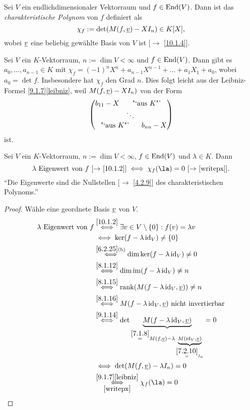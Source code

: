 \documentclass[../../main.tex]{subfiles}
\begin{document}
\begin{df}\label{10.1.5}
Sei $V$ ein endlichdimensionaler Vektorraum und $f\in \operatorname{End}(V)$. Dann ist das \emph{charakteristische Polynom} von $f$ definiert als \[\chi_f := \det(M(f,{\underline v})- XI_n)\in K[X],\] wobei ${\underline v}$ eine beliebig gewählte Basis von $V$ ist [$\to$ \ref{10.1.4}].
\end{df}

\begin{bem}\label{10.1.6}
Sei $V$ ein $K$-Vektorraum, $n:= \dim V < \infty$ und $f\in \operatorname{End}(V)$. Dann gibt es $a_0,\ldots,a_{n-1}\in K$ mit $\chi_f = (-1)^nX^n+ a_{n-1}X^{n-1} + \ldots + a_1X_1+a_0$, wobei $a_0 = \det f$. Insbesondere hat $\chi_f$ den Grad $n$.
Dies folgt leicht aus der Leibniz-Formel \ref{9.1.7}\eqref{leibniz}, weil $M(f,{\underline v})- XI_n)$ von der Form
\[\begin{pmatrix}
b_{11}-X &\multicolumn{2}{c}{\text{"`aus $K$"'}}\\
& \ddots\\
\multicolumn{2}{c}{\text{"`aus $K$"'}} & b_{nn}-X
\end{pmatrix}\]
ist.
\end{bem}

\begin{pro}\label{10.1.7}
Sei $V$ ein $K$-Vektorraum, $n:=\dim V < \infty$, $f\in \operatorname{End}(V)$ und $\lambda\in K$. Dann
\[\lambda\text{ Eigenwert von }f \text{ \rm[$\to$ \ref{10.1.2}]} \iff \chi_f(\la) = 0 \text{ \rm[$\to$ \ref{writepx}]}.\]
"`Die Eigenwerte sind die Nullstellen {\rm[$\to$ \ref{4.2.9}]} des charakteristischen Polynoms."'
\end{pro}
\begin{proof} Wähle eine geordnete Basis ${\underline v}$ von $V$.
\begin{align*}
\lambda\text{ Eigenwert von } f & \overset{\ref{10.1.2}}{\iff} \exists v\in V\setminus \left\{0\right\}: f(v) = \lambda v\\
& \iff \ker(f-\lambda\id_V)\ne \left\{0\right\}\\
& \overset{\ref{6.2.25} \text{(b)}}{\iff} \dim \ker (f-\lambda\id_V) \ne 0\\
& \overset{\ref{8.1.12}}{\iff} \dim\im (f-\lambda\id_V)\ne n\\
& \overset{\ref{8.1.15}}{\iff} \rank (M(f-\lambda\id_V,\v))\ne n\\
& \overset{\ref{8.1.16}}{\iff} M(f- \lambda\id_V,\v) \text{ nicht invertierbar}\\
& \overset{\ref{9.1.14}}{\iff} \det\underbrace{M(f-\lambda\id_V,\v)}_{\overset{\ref{7.1.8}}{=} M(f,\v) - \lambda \underbrace{\scriptstyle M(\id_V,\v)}_{\overset{\ref{7.2.10}}{=} I_n}} = 0\\
&\iff \det(M(f,\v)-\lambda I_n) = 0\\
&\overset{\ref{9.1.7}\eqref{leibniz}}{\underset{\ref{writepx}}{\iff}} \chi_f(\la) = 0
\end{align*}
\end{proof}
\end{document}
